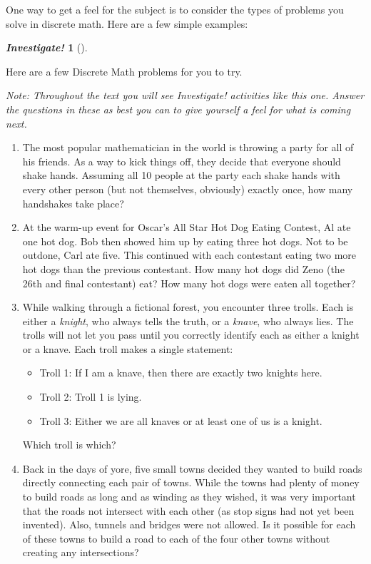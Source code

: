 \documentclass[10pt,]{book}
\theoremstyle{plain}
\theoremstyle{definition}
\theoremstyle{definition}
\newtheorem{activity}[project]{\emph{Investigate!}}
\theoremstyle{definition}
\begin{document}
    One way to get a feel for the subject is to consider the types of problems you solve in discrete math. Here are a few simple examples:
\begin{activity}[]\label{activity-1}

      Here are a few Discrete Math problems for you to try.
\par

      \emph{Note: Throughout the text you will see \emph{Investigate!} activities like this one. Answer the questions in these as best you can to give yourself a feel for what is coming next.}
\leavevmode%
\begin{enumerate}
\item\hypertarget{li-1}{}
        The most popular mathematician in the world is throwing a party for all of his friends. As a way to kick things off, they decide that everyone should shake hands. Assuming all 10 people at the party each shake hands with every other person (but not themselves,
        obviously) exactly once, how many handshakes take place?
      \item\hypertarget{li-2}{}
        At the warm-up event for Oscar's All Star Hot Dog Eating Contest, Al ate one hot dog. Bob then showed him up by eating three hot dogs. Not to be outdone, Carl ate five. This continued with each contestant eating two more hot dogs than the previous contestant.
        How many hot dogs did Zeno (the 26th and final contestant) eat? How many hot dogs were eaten all together?
      \item\hypertarget{li-3}{}
        While walking through a fictional forest, you encounter three trolls. Each is either a \emph{knight}, who always tells the truth, or a \emph{knave}, who always lies. The trolls will not let you pass until you correctly identify each as either
        a knight or a knave. Each troll makes a single statement:


        \begin{itemize}[label=\textbullet]
\item{}Troll 1: If I am a knave, then there are exactly two knights here.\item{}Troll 2: Troll 1 is lying.\item{}Troll 3: Either we are all knaves or at least one of us is a knight.\end{itemize}



        Which troll is which?
      \item\hypertarget{li-7}{}
        Back in the days of yore, five small towns decided they wanted to build roads directly connecting each pair of towns. While the towns had plenty of money to build roads as long and as winding as they wished, it was very important that the roads not intersect
        with each other (as stop signs had not yet been invented). Also, tunnels and bridges were not allowed. Is it possible for each of these towns to build a road to each of the four other towns without creating any intersections?
      \end{enumerate}
\end{activity}
\par
\end{document}
